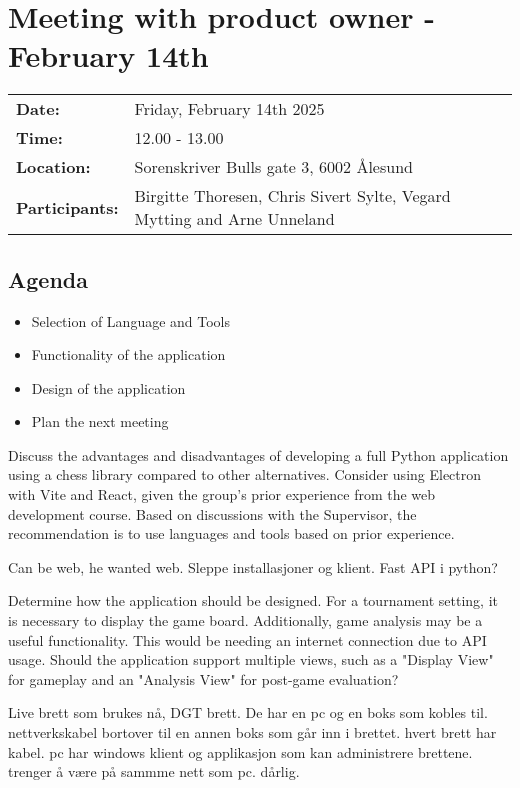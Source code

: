 \section{Meeting with product owner - February 14th}
\begin{tabular}{ll}
    \textbf{Date:} & Friday, February 14th 2025 \\
    \textbf{Time:} & 12.00 - 13.00\\
    \textbf{Location:} & Sorenskriver Bulls gate 3, 6002 Ålesund \\
    \textbf{Participants:} & Birgitte Thoresen, Chris Sivert Sylte, Vegard Mytting and Arne Unneland\\
\end{tabular}

\vspace{0.5cm}

\subsection{Agenda}

\begin{itemize}
    \item Selection of Language and Tools
    \item Functionality of the application
    \item Design of the application
    \item Plan the next meeting
\end{itemize}

Discuss the advantages and disadvantages of developing a full Python application using a chess library compared to other alternatives. Consider  using Electron with Vite and React, given the group's prior experience from the web development course. Based on discussions with the Supervisor, the recommendation is to use languages and tools based on prior experience.

Can be web, he wanted web. Sleppe installasjoner og klient. Fast API i python? 

Determine how the application should be designed. For a tournament setting, it is necessary to display the game board. Additionally, game analysis may be a useful functionality. This would be needing an internet connection due to API usage. Should the application support multiple views, such as a "Display View" for gameplay and an "Analysis View" for post-game evaluation?

Live brett som brukes nå, DGT brett. De har en pc og en boks som kobles til. nettverkskabel bortover til en annen boks som går inn i brettet. hvert brett har kabel. pc har windows klient og applikasjon som kan administrere brettene. trenger å være på sammme nett som pc. dårlig. 

